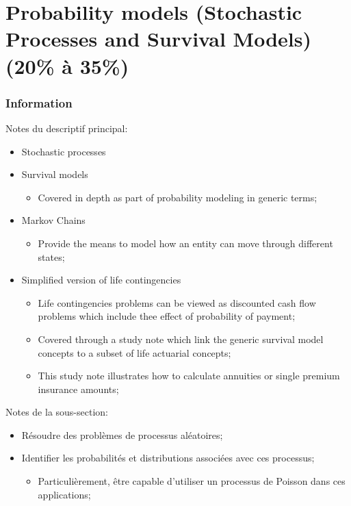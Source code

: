 \chapter[Probability models (Stochastic Processes and Survival Models)]{Probability models (Stochastic Processes and Survival Models) (20\% à 35\%)}

\subsection{Information}

\begin{distributions}[Description]
Notes du descriptif principal:
\begin{itemize}
	\item	Stochastic processes
	\item	Survival models
		\begin{itemize}
		\item	Covered in depth as part of probability modeling in generic terms;
		\end{itemize}
	\item	Markov Chains
		\begin{itemize}
		\item	Provide the means to model how an entity can move through different states;
		\end{itemize}
	\item	Simplified version of life contingencies
		\begin{itemize}
		\item	Life contingencies problems can be viewed as discounted cash flow problems which include thee effect of probability of payment;
		\item	Covered through a study note which link the generic survival model concepts to a subset of life actuarial concepts;
		\item	This study note illustrates how to calculate annuities or single premium insurance amounts;
		\end{itemize}
\end{itemize}
\tcbline
Notes de la sous-section:
\begin{itemize}
	\item	Résoudre des problèmes de processus aléatoires;
	\item	Identifier les probabilités et distributions associées avec ces processus;
		\begin{itemize}
		\item	Particulièrement, être capable d'utiliser un processus de Poisson dans ces applications;

\end{itemize}
\end{itemize}
\end{distributions}

